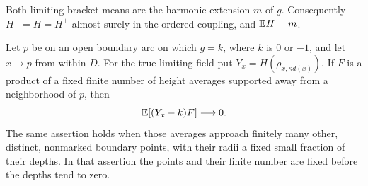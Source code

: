 \begin{proposition}
\label{prop:boundary-trace}
Both limiting bracket means are the harmonic extension $m$ of $g$.
Consequently $H^-=H=H^+$ almost surely in the ordered coupling, and
$\mathbb E H=m$.

Let $p$ be on an open boundary arc on which $g=k$, where $k$ is
$0$ or $-1$, and let $x\to p$ from within $D$. For the true limiting
field put $Y_x=H(\rho_{x,\kappa d(x)})$. If $F$ is a product of a fixed
finite number of height averages supported away from a neighborhood
of $p$, then
\begin{equation}
                      \mathbb E[(Y_x-k)F]\longrightarrow0.
 \label{eq:mixed-boundary-trace}
\end{equation}
The same assertion holds when those averages approach finitely many
other, distinct, nonmarked boundary points, with their radii a fixed
small fraction of their depths. In that assertion the points and their
finite number are fixed before the depths tend to zero.
\end{proposition}

